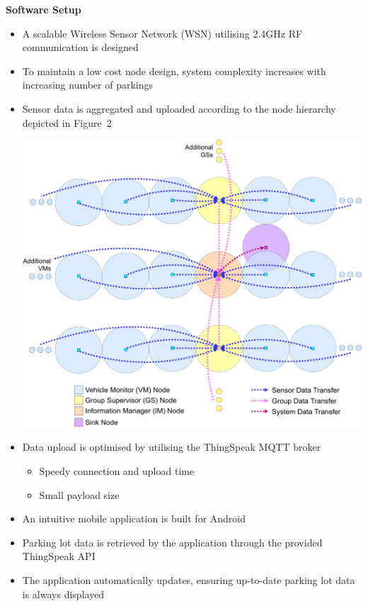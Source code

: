 \documentclass[landscape,a1paper,fontscale=0.47]{baposter} %
\newcommand{\compresslist}{ %
\setlength{\itemsep}{1pt}
\setlength{\parskip}{0pt}
\setlength{\parsep}{0pt}
}
\begin{document}
\begin{poster}
{\begin{multicols}{2}
		\textbf{Software Setup}
			\begin{itemize}[leftmargin=13pt]\compresslist
				\item A scalable Wireless Sensor Network (WSN) utilising 2.4GHz RF communication is designed
				\item To maintain a low cost node design, system complexity increases with increasing number of parkings
				\item Sensor data is aggregated and uploaded according to the node hierarchy depicted in Figure~2
				\begin{center}
					\includegraphics[width=0.84\columnwidth]{mesh-cropped}
				\end{center}
			\vspace{0.5mm}
				\item Data upload is optimised by utilising the ThingSpeak MQTT broker
					\begin{itemize}[leftmargin=13pt]\compresslist
						\item Speedy connection and upload time
						\item Small payload size
					\end{itemize}
				\item An intuitive mobile application is built for Android
				\item Parking lot data is retrieved by the application through the provided ThingSpeak API
				\item The application automatically updates, ensuring up-to-date parking lot data is always displayed 
			\end{itemize}
		

\end{multicols}}
\end{poster}
\end{document}
